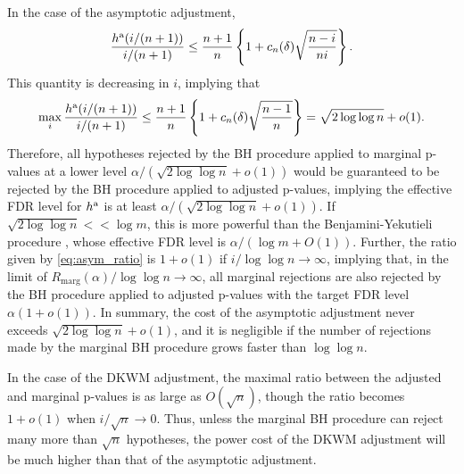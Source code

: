 \documentclass[11pt]{article}
\def\asym{\textnormal{a}}
\begin{document}
In the case of the asymptotic adjustment, 
\begin{equation}\label{eq:asym_ratio}
\frac{h^\asym (i/(n+1))}{i/(n+1)} \le \frac{n+1}{n}\left\{1 + c_{n}(\delta)\sqrt{\frac{n - i}{ni}}\right\}.
\end{equation}
This quantity is decreasing in $i$, implying that
 \[\max_{i}\frac{h^\asym (i/(n+1))}{i/(n+1)}\le \frac{n+1}{n}\left\{1 + c_{n}(\delta)\sqrt{\frac{n - 1}{n}}\right\}= \sqrt{2\log \log n} + o(1).\]
Therefore, all hypotheses rejected by the BH procedure applied to marginal p-values at a lower level $\alpha / (\sqrt{2\log \log n} + o(1))$ would be guaranteed to be rejected by the BH procedure applied to adjusted p-values, implying the effective FDR level for $h^\asym$ is at least $\alpha / (\sqrt{2\log\log n} + o(1))$. If $\sqrt{2\log \log n} <\!\!< \log m$, this is more powerful than the Benjamini-Yekutieli procedure \citep{benjamini2001control}, whose effective FDR level is $\alpha / (\log m + O(1))$. Further, the ratio given by \eqref{eq:asym_ratio} is $1 + o(1)$ if $i / \log \log n \rightarrow \infty$, implying that, in the limit of $R_{\mathrm{marg}}(\alpha) / \log \log n\rightarrow \infty$, all marginal rejections are also rejected by the BH procedure applied to adjusted p-values with the target FDR level $\alpha(1 + o(1))$. In summary, the cost of the asymptotic adjustment never exceeds $\sqrt{2\log \log n} + o(1)$, and it is negligible if the number of rejections made by the marginal BH procedure grows faster than $\log \log n$.

In the case of the DKWM adjustment, the maximal ratio between the adjusted and marginal p-values is as large as $O(\sqrt{n})$, though the ratio becomes $1 + o(1)$ when $i / \sqrt{n}\rightarrow 0$. Thus, unless the marginal BH procedure can reject many more than $\sqrt{n}$ hypotheses, the power cost of the DKWM adjustment will be much higher than that of the asymptotic adjustment.
\end{document}
